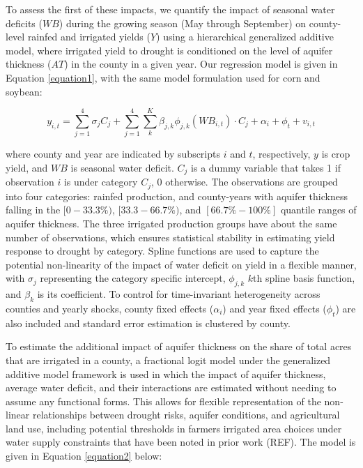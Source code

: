 \documentclass[
]{article}
\begin{document}
To assess the first of these impacts, we quantify the impact of seasonal water deficits (\(WB\)) during the growing season (May through September) on county-level rainfed and irrigated yields (\(Y\)) using a hierarchical generalized additive model, where irrigated yield to drought is conditioned on the level of aquifer thickness (\(AT\)) in the county in a given year. Our regression model is given in Equation \ref{equation1}, with the same model formulation used for corn and soybean:

\begin{equation}\label{equation1}
y_{i,t} = \sum_{j=1}^4 \sigma_j C_j + \sum_{j=1}^4 \sum_{k}^K \beta_{j,k}\phi_{j,k}(WB_{i,t})\cdot C_j  + \alpha_i + \phi_t + v_{i,t}
\end{equation}

where county and year are indicated by subscripts \(i\) and \(t\), respectively, \(y\) is crop yield, and \(WB\) is seasonal water deficit. \(C_j\) is a dummy variable that takes 1 if observation \(i\) is under category \(C_j\), 0 otherwise. The observations are grouped into four categories: rainfed production, and county-years with aquifer thickness falling in the \([0-33.3\%)\), \([33.3-66.7\%)\), and \([66.7\% - 100\%]\) quantile ranges of aquifer thickness. The three irrigated production groups have about the same number of observations, which ensures statistical stability in estimating yield response to drought by category. Spline functions are used to capture the potential non-linearity of the impact of water deficit on yield in a flexible manner, with \(\sigma_j\) representing the category specific intercept, \(\phi_{j,k}\) \(k\)th spline basis function, and \(\beta_k\) is its coefficient. To control for time-invariant heterogeneity across counties and yearly shocks, county fixed effects (\(\alpha_i\)) and year fixed effects (\(\phi_t\)) are also included and standard error estimation is clustered by county.

To estimate the additional impact of aquifer thickness on the share of total acres that are irrigated in a county, a fractional logit model under the generalized additive model framework is used in which the impact of aquifer thickness, average water deficit, and their interactions are estimated without needing to assume any functional forms. This allows for flexible representation of the non-linear relationships between drought risks, aquifer conditions, and agricultural land use, including potential thresholds in farmers irrigated area choices under water supply constraints that have been noted in prior work (REF). The model is given in Equation \ref{equation2} below:
\end{document}
